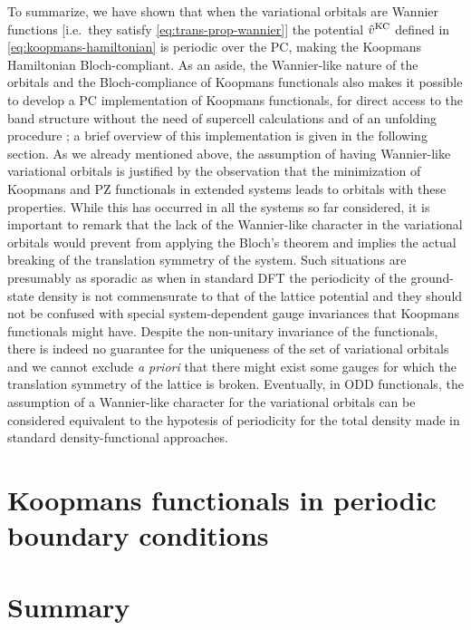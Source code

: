 To summarize, we have shown that when the variational orbitals are Wannier functions [i.e.\ they satisfy \cref{eq:trans-prop-wannier}] the potential $\hat{v}^{\rm KC}$ defined in \cref{eq:koopmans-hamiltonian} is periodic over the PC, making the Koopmans Hamiltonian Bloch-compliant. As an aside, the Wannier-like nature of the orbitals and the Bloch-compliance of Koopmans functionals also makes it possible to develop a PC implementation of Koopmans functionals, for direct access to the band structure without the need of supercell calculations and of an unfolding procedure \cite{colonna_koopmans_2022}; a brief overview of this implementation is given in the following section. As we already mentioned above, the assumption of having Wannier-like variational orbitals is justified by the observation that the minimization of Koopmans and PZ functionals in extended systems leads to orbitals with these properties. While this has occurred in all the systems so far considered, it is important to remark that the lack of the Wannier-like character in the variational orbitals would prevent from applying the Bloch's theorem and implies the actual breaking of the translation symmetry of the system. Such situations are presumably as sporadic as when in standard DFT the periodicity of the ground-state density is not commensurate to that of the lattice potential and they should not be confused with special system-dependent gauge invariances that Koopmans functionals might have. Despite the non-unitary invariance of the functionals, there is indeed no guarantee for the uniqueness of the set of variational orbitals and we cannot exclude \emph{a priori} that there might exist some gauges for which the translation symmetry of the lattice is broken. Eventually, in ODD functionals, the assumption of a Wannier-like character for the variational orbitals can be considered equivalent to the hypotesis of periodicity for the total density made in standard density-functional approaches.

\section{Koopmans functionals in periodic boundary conditions\label{sec:koopmans-pbc}}

\section{Summary\label{sec:ch4-summary}}

